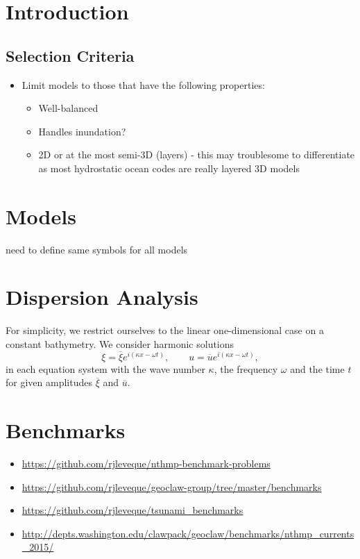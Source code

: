 \documentclass[]{article}
\begin{document}
\section{Introduction}

\subsection{Selection Criteria}
\begin{itemize}
    \item Limit models to those that have the following properties:
    \begin{itemize}
        \item Well-balanced
        \item Handles inundation?
        \item 2D or at the most semi-3D (layers) - this may troublesome to differentiate as most hydrostatic ocean codes are really layered 3D models
    \end{itemize}
\end{itemize}

\section{Models} 
need to define same symbols for all models


\section{Dispersion Analysis} \label{sec:dispersion}
For simplicity, we restrict ourselves to the linear one-dimensional case on a constant bathymetry.
We consider harmonic solutions 
\[
 \xi=\overline{\xi}e^{i(\kappa x-\omega t)}, \qquad u=\overline{u}e^{i(\kappa x-\omega t)},
\]
in each equation system with the wave number $\kappa$, the frequency $\omega$ and the time $t$ for given amplitudes $\overline{\xi}$ and $\overline{u}$.


\section{Benchmarks}

\begin{itemize}
    \item \url{https://github.com/rjleveque/nthmp-benchmark-problems}
    \item \url{https://github.com/rjleveque/geoclaw-group/tree/master/benchmarks}
    \item \url{https://github.com/rjleveque/tsunami_benchmarks}
    \item \url{http://depts.washington.edu/clawpack/geoclaw/benchmarks/nthmp_currents_2015/}
\end{itemize}
\end{document}
